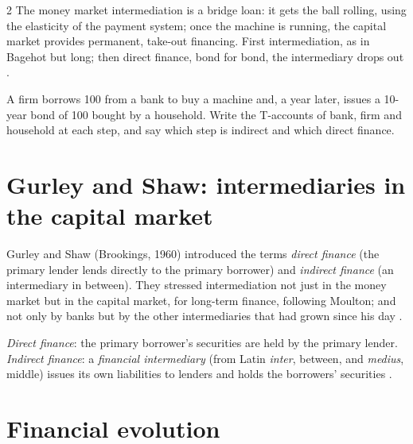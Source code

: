 \begin{paracol}{2}
The money market intermediation is a bridge loan: it gets the ball rolling, using the elasticity of the payment system; once the machine is running, the capital
market provides permanent, take-out financing. First intermediation, as in Bagehot but long; then direct finance, bond for bond, the intermediary drops out
.

\begin{exercise}
A firm borrows 100 from a bank to buy a machine and, a year later, issues a 10-year bond of 100 bought by a household. Write the T-accounts of bank, firm and
household at each step, and say which step is indirect and which direct finance.
\end{exercise}

\section{Gurley and Shaw: intermediaries in the capital market}\label{sec:di-gurleyshaw}

\begin{reading}
Gurley and Shaw (Brookings, 1960) introduced the terms \emph{direct finance} (the primary lender lends directly to the primary borrower) and \emph{indirect
finance} (an intermediary in between). They stressed intermediation not just in the money market but in the capital market, for long-term finance, following
Moulton; and not only by banks but by the other intermediaries that had grown since his day .
\end{reading}

\begin{definition}
\emph{Direct finance}: the primary borrower's securities are held by the primary lender. \emph{Indirect finance}: a \emph{financial intermediary} (from Latin
\emph{inter}, between, and \emph{medius}, middle) issues its own liabilities to lenders and holds the borrowers' securities .
\end{definition}

\section{Financial evolution}\label{sec:di-finevol}


\end{paracol}
